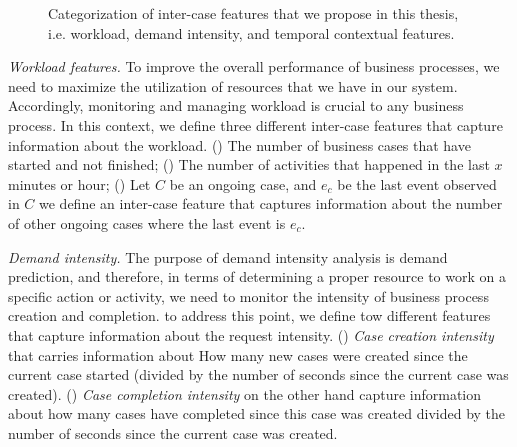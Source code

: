 \begin{figure}[htb]
	\begin{center}
		\caption[Inter-case features]{Categorization of inter-case features that we propose in this thesis, i.e. workload, demand intensity, and temporal contextual features.
		}
		\label{fig:inter1}
	\end{center}
\end{figure}

\textit{Workload features.} To improve the overall performance of business processes, we need to maximize the utilization of resources that we have in our system. Accordingly, monitoring and managing workload is crucial to any business process. In this context, we define three different inter-case features that capture information about the workload. () The number of business cases that have started and not finished; () The number of activities that happened in the last $x$ minutes or hour; () Let $C$ be an ongoing case, and  $e_c$ be the last event observed in $C$  we define an inter-case feature that captures information about the number of other ongoing cases where the last event is $e_c$.

\textit{Demand intensity.} The purpose of demand intensity analysis is demand prediction, and therefore, in terms of determining a proper resource to work on a specific action or activity, we need to monitor the intensity of business process creation and completion.   to address this point, we define tow different features that capture information about the request intensity. () \textit{Case creation intensity} that carries information about How many new cases were created since the current case started (divided by the number of seconds since the current case was created). () \textit{Case completion intensity} on the other hand capture information about how many cases have completed since this case was created divided by the number of seconds since the current case was created.


